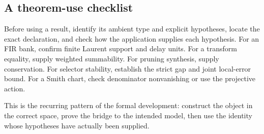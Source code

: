\subsection{A theorem-use checklist}
Before using a result, identify its ambient type and explicit hypotheses, locate the exact declaration, and check how the application supplies each hypothesis. For an FIR bank, confirm finite Laurent support and delay units. For a transform equality, supply weighted summability. For pruning synthesis, supply conservation. For selector stability, establish the strict gap and joint local-error bound. For a Smith chart, check denominator nonvanishing or use the projective action.

This is the recurring pattern of the formal development: construct the object in the correct space, prove the bridge to the intended model, then use the identity whose hypotheses have actually been supplied.
